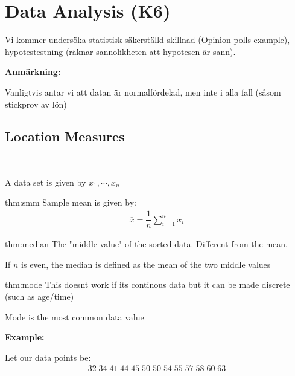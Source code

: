 \section{Data Analysis (K6)}\par
\noindent Vi kommer undersöka statistisk säkerställd skillnad (Opinion polls example), hypotestestning (räknar sannolikheten att hypotesen är sann).
\par\bigskip
\noindent\textbf{Anmärkning:}\par
\noindent Vanligtvis antar vi att datan är normalfördelad, men inte i alla fall (såsom stickprov av lön)
\par\bigskip
\subsection{Location Measures}\hfill\\\par
\noindent A data set is given by $x_1,\cdots,x_n$
\par\bigskip
\begin{theo}{thm:smm}
  Sample mean is given by:
  \begin{equation*}
    \begin{gathered}
      \overline{x} = \dfrac{1}{n}\sum_{i=1}^{n}x_i
    \end{gathered}
  \end{equation*}
\end{theo}
\par\bigskip
\begin{theo}[Median]{thm:median}
  The "middle value" of the sorted data. Different from the mean.\par
  \noindent If $n$ is even, the median is defined as the mean of the two middle values
\end{theo}
\par\bigskip
\begin{theo}[Mode]{thm:mode}
  This doesnt work if its continous data but it can be made discrete (such as age/time)\par
  \noindent Mode is the most common data value
\end{theo}
\par\bigskip
\noindent\textbf{Example:}\par
\noindent Let our data points be:
\begin{equation*}
  \begin{gathered}
    32\; 34\; 41\; 44\; 45\; 50\; 50\; 54\; 55\; 57\; 58\; 60\; 63
  \end{gathered}
\end{equation*}\par
